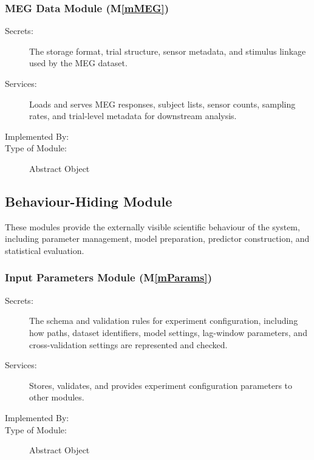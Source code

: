 \documentclass[12pt, titlepage]{article}
\newcommand{\mref}[1]{M\ref{#1}}
\begin{document}
\subsubsection{MEG Data Module (\mref{mMEG})}

\begin{description}
\item[Secrets:] The storage format, trial structure, sensor metadata, and
stimulus linkage used by the MEG dataset.
\item[Services:] Loads and serves MEG responses, subject lists, sensor counts, sampling rates, and trial-level metadata for downstream analysis.
\item[Implemented By:] \progname{}
\item[Type of Module:] Abstract Object
\end{description}





\subsection{Behaviour-Hiding Module}


These modules provide the externally visible scientific behaviour of the
system, including parameter management, model preparation, predictor
construction, and statistical evaluation.




\subsubsection{Input Parameters Module (\mref{mParams})}

\begin{description}
\item[Secrets:] The schema and validation rules for experiment configuration, including how paths, dataset identifiers, model settings, lag-window parameters, and cross-validation settings are represented and checked.
\item[Services:] Stores, validates, and provides experiment configuration
parameters to other modules.
\item[Implemented By:] \progname{}
\item[Type of Module:] Abstract Object
\end{description}
\end{document}
